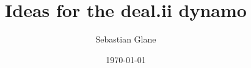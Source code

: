 \documentclass[%
	paper=letter,
	twoside=false,
	fontsize=12pt,
	titlepage=false,
	listof=totoc,
	bibliography=totoc,
	listof=flat,
	cleardoublepage=empty,
	headsepline=true,
	footsepline=false,
	captions=tableheading,
	numbers=noendperiod,
	headings=normal,
]{scrartcl}
\begin{document}
\title{Ideas for the deal.ii dynamo}
\author{Sebastian Glane}
\date{\today}
\maketitle
\tableofcontents

\cleardoublepage
\printbibliography
\end{document}
